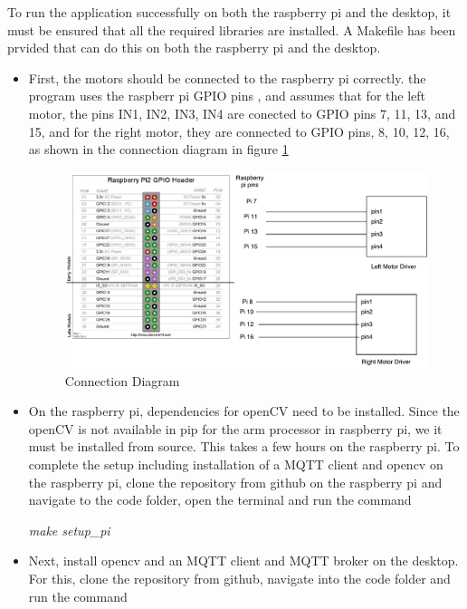 \documentclass[sigconf]{acmart}
\begin{document}
To run the application successfully on both the raspberry pi and the desktop, it must be ensured that all the required libraries are installed. A Makefile has been prvided that can do this on both the raspberry pi and the desktop.

\begin{itemize}

\item First, the motors should be connected to the raspberry pi correctly.
the program uses the raspberr pi GPIO pins , and assumes that for the left motor, the pins IN1, IN2, IN3, IN4 are conected to GPIO pins 7, 11, 13, and 15, and for the right motor, they are connected to GPIO pins, 8, 10, 12, 16, as shown in the connection diagram in figure
\ref{f:connection}

\begin{figure}[!ht]
  \centering\includegraphics[width=\columnwidth]{images/connection.pdf}
  \caption{Connection Diagram}\label{f:connection}
\end{figure}

\item On the raspberry pi, dependencies for openCV need to be installed. Since the openCV is not available in pip for the arm processor in raspberry pi, we it must be installed from source. This takes a few hours on the raspberry pi. To complete the setup including installation of a MQTT client and opencv on the raspberry pi, clone the repository from github on the raspberry pi and navigate to the code folder, open the terminal and run the command

{\em make setup\_pi}

\item Next, install opencv and an MQTT client and MQTT broker on the desktop. For this, clone the repository from github, navigate into the code folder and run the command 


\end{itemize}
\end{document}
